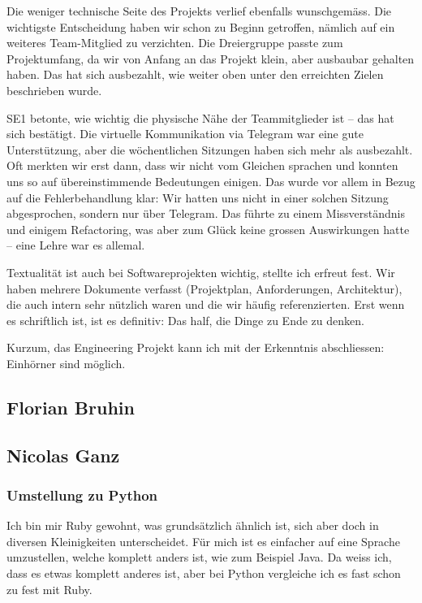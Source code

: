 \documentclass[a4paper]{article}
\begin{document}
Die weniger technische Seite des Projekts verlief ebenfalls wunschgemäss. Die wichtigste Entscheidung haben wir schon zu Beginn getroffen, nämlich auf ein weiteres Team-Mitglied zu verzichten. Die Dreiergruppe passte zum Projektumfang, da wir von Anfang an das Projekt klein, aber ausbaubar gehalten haben. Das hat sich ausbezahlt, wie weiter oben unter den erreichten Zielen beschrieben wurde.

SE1 betonte, wie wichtig die physische Nähe der Teammitglieder ist -- das hat sich bestätigt. Die virtuelle Kommunikation via Telegram war eine gute Unterstützung, aber die wöchentlichen Sitzungen haben sich mehr als ausbezahlt. Oft merkten wir erst dann, dass wir nicht vom Gleichen sprachen und konnten uns so auf übereinstimmende Bedeutungen einigen. Das wurde vor allem in Bezug auf die Fehlerbehandlung klar: Wir hatten uns nicht in einer solchen Sitzung abgesprochen, sondern nur über Telegram. Das führte zu einem Missverständnis und einigem Refactoring, was aber zum Glück keine grossen Auswirkungen hatte -- eine Lehre war es allemal.

Textualität ist auch bei Softwareprojekten wichtig, stellte ich erfreut fest. Wir haben mehrere Dokumente verfasst (Projektplan, Anforderungen, Architektur), die auch intern sehr nützlich waren und die wir häufig referenzierten. Erst wenn es schriftlich ist, ist es definitiv: Das half, die Dinge zu Ende zu denken.

Kurzum, das Engineering Projekt kann ich mit der Erkenntnis abschliessen: Einhörner sind möglich.

  \subsection{Florian Bruhin}


  \subsection{Nicolas Ganz}

  \subsubsection{Umstellung zu Python}

  Ich bin mir Ruby gewohnt, was grundsätzlich ähnlich ist, sich aber doch in diversen Kleinigkeiten unterscheidet.
  Für mich ist es einfacher auf eine Sprache umzustellen, welche komplett anders ist, wie zum Beispiel Java.
  Da weiss ich, dass es etwas komplett anderes ist, aber bei Python vergleiche ich es fast schon zu fest mit Ruby.
\end{document}

